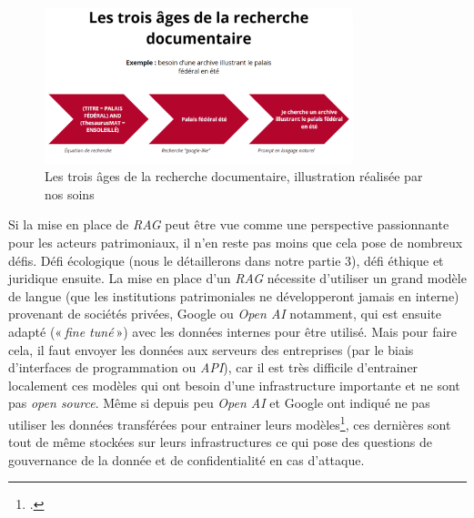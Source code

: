 \begin{figure}[h!]
	\centering
	\includegraphics[width=0.8\textwidth]{images/image23.png}
	\caption{Les trois âges de la recherche documentaire, illustration réalisée par nos soins}
	\label{fig:image23}
\end{figure}

Si la mise en place de \textit{RAG} peut être vue comme une perspective passionnante pour les acteurs patrimoniaux, il n’en reste pas moins que cela pose de nombreux défis. Défi écologique (nous le détaillerons dans notre partie 3), défi éthique et juridique ensuite. La mise en place d’un \textit{RAG} nécessite d’utiliser un grand modèle de langue (que les institutions patrimoniales ne développeront jamais en interne) provenant de sociétés privées, Google ou \textit{Open AI} notamment, qui est ensuite adapté (« \textit{fine tuné} ») avec les données internes pour être utilisé. Mais pour faire cela, il faut envoyer les données aux serveurs des entreprises (par le biais d’interfaces de programmation ou \textit{API}), car il est très difficile d’entrainer localement ces modèles qui ont besoin d’une infrastructure importante et ne sont pas \textit{open source}. Même si depuis peu \textit{Open AI} et Google ont indiqué ne pas utiliser les données transférées pour entrainer leurs modèles\footcite{rochefort2023}, ces dernières sont tout de même stockées sur leurs infrastructures ce qui pose des questions de gouvernance de la donnée et de confidentialité en cas d’attaque.

